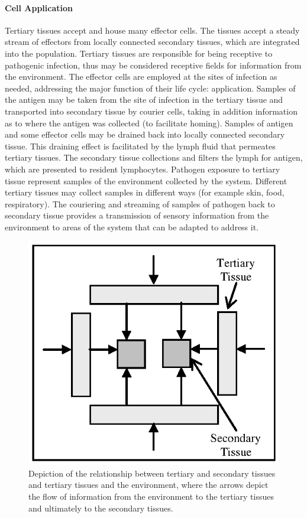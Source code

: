 \paragraph{Cell Application}
Tertiary tissues accept and house many effector cells. The tissues accept a steady stream of effectors from locally connected secondary tissues, which are integrated into the population. Tertiary tissues are responsible for being receptive to pathogenic infection, thus may be considered receptive fields for information from the environment. The effector cells are employed at the sites of infection as needed, addressing the major function of their life cycle: application. Samples of the antigen may be taken from the site of infection in the tertiary tissue and transported into secondary tissue by courier cells, taking in addition information as to where the antigen was collected (to facilitate homing). Samples of antigen and some effector cells may be drained back into locally connected secondary tissue. This draining effect is facilitated by the lymph fluid that permeates tertiary tissues. The secondary tissue collections and filters the lymph for antigen, which are presented to resident lymphocytes. Pathogen exposure to tertiary tissue represent samples of the environment collected by the system. Different tertiary tissues may collect samples in different ways (for example skin, food, respiratory). The couriering and streaming of samples of pathogen back to secondary tissue provides a transmission of sensory information from the environment to areas of the system that can be adapted to address it. 

\begin{figure}[ht]
	\centering
	\includegraphics[scale=0.75]{Tissues/tissues-architecture-application}
	\caption{Depiction of the relationship between tertiary and secondary tissues and tertiary tissues and the environment, where the arrows depict the flow of information from the environment to the tertiary tissues and ultimately to the secondary tissues.}
	\label{fig:tissues:architecture:application}
\end{figure}


